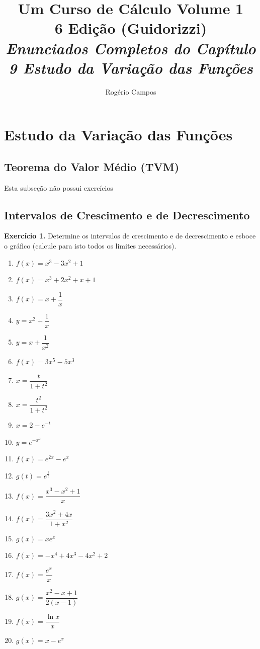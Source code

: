 \documentclass[12pt,a4paper]{article}
\title{
    \Huge \textbf{Um Curso de Cálculo Volume 1} \\
    \vspace{0.3cm}
    \Large 6\textordfeminine{} Edição (Guidorizzi) \\
    \vspace{0.5cm}
    \large \textit{Enunciados Completos do Capítulo 9 Estudo da Variação das Funções}
}
\author{Rogério Campos}
\begin{document}
\maketitle
\newpage

\tableofcontents
\newpage

\setcounter{section}{8}
\setcounter{subsection}{0}

\section{Estudo da Variação das Funções}

\subsection{Teorema do Valor Médio (TVM)}
Esta subseção não possui exercícios

\subsection{Intervalos de Crescimento e de Decrescimento}
\vspace{0.5cm}
\noindent\textbf{Exercício 1.} Determine os intervalos de crescimento e de decrescimento e esboce o gráfico (calcule para isto todos os limites necessários).
\begin{enumerate}
    \renewcommand{\theenumi}{\alph{enumi}}
    \renewcommand{\labelenumi}{\theenumi)}
    \item $f(x) = x^3 - 3x^2 + 1$
    \item $f(x) = x^3 + 2x^2 + x + 1$
    \item $f(x) = x + \dfrac{1}{x}$
    \item $y = x^2 + \dfrac{1}{x}$
    \item $y = x + \dfrac{1}{x^2}$
    \item $f(x) = 3x^5 - 5x^3$
    \item $x = \dfrac{t}{1 + t^2}$
    \item $x = \dfrac{t^2}{1 + t^2}$
    \item $x = 2 - e^{-t}$
    \item $y = e^{-x^2}$
    \item $f(x) = e^{2x} - e^x$
    \item $g(t) = e^{\frac{1}{t}}$
    \item $f(x) = \dfrac{x^3 - x^2 + 1}{x}$
    \item $f(x) = \dfrac{3x^2 + 4x}{1 + x^2}$
    \item $g(x) = x e^x$
    \item $f(x) = -x^4 + 4x^3 - 4x^2 + 2$
    \item $f(x) = \dfrac{e^x}{x}$
    \item $g(x) = \dfrac{x^2 - x + 1}{2(x - 1)}$
    \item $f(x) = \dfrac{\ln x}{x}$
    \item $g(x) = x - e^x$
\end{enumerate}
\end{document}
